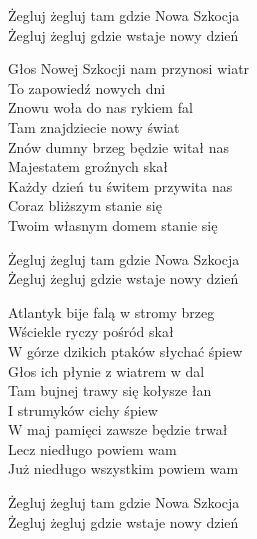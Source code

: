 \begin{text}

    \vin Żegluj żegluj tam gdzie Nowa Szkocja\\
    \vin Żegluj żegluj gdzie wstaje nowy dzień
	
    Głos Nowej Szkocji nam przynosi wiatr\\
    To zapowiedź nowych dni\\
    Znowu woła do nas rykiem fal\\
    Tam znajdziecie nowy świat\\
    Znów dumny brzeg będzie witał nas\\
    Majestatem groźnych skał\\
    Każdy dzień tu świtem przywita nas\\
    Coraz bliższym stanie się\\
    Twoim własnym domem stanie się
	
    \vin Żegluj żegluj tam gdzie Nowa Szkocja\\
    \vin Żegluj żegluj gdzie wstaje nowy dzień

    Atlantyk bije falą w stromy brzeg\\
    Wściekle ryczy pośród skał\\
    W górze dzikich ptaków słychać śpiew\\
    Głos ich płynie z wiatrem w dal\\
    Tam bujnej trawy się kołysze łan\\
    I strumyków cichy śpiew\\
    W maj pamięci zawsze będzie trwał\\
    Lecz niedługo powiem wam\\
    Już niedługo wszystkim powiem wam
	
    \vin Żegluj żegluj tam gdzie Nowa Szkocja\\
    \vin Żegluj żegluj gdzie wstaje nowy dzień

\end{text}
